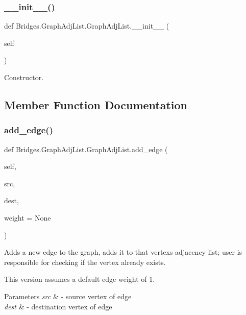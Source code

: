\subsubsection{\texorpdfstring{\+\_\+\+\_\+init\+\_\+\+\_\+()}{\_\_init\_\_()}}
{\footnotesize\ttfamily def Bridges.\+Graph\+Adj\+List.\+Graph\+Adj\+List.\+\_\+\+\_\+init\+\_\+\+\_\+ (\begin{DoxyParamCaption}\item[{}]{self }\end{DoxyParamCaption})}



Constructor. 



\subsection{Member Function Documentation}
\mbox{\label{class_bridges_1_1_graph_adj_list_1_1_graph_adj_list_a34468778a7dade4ed5a826847352f52d}} 
\subsubsection{\texorpdfstring{add\+\_\+edge()}{add\_edge()}}
{\footnotesize\ttfamily def Bridges.\+Graph\+Adj\+List.\+Graph\+Adj\+List.\+add\+\_\+edge (\begin{DoxyParamCaption}\item[{}]{self,  }\item[{}]{src,  }\item[{}]{dest,  }\item[{}]{weight = {\ttfamily None} }\end{DoxyParamCaption})}



Adds a new edge to the graph, adds it to that vertex\textquotesingle{}s adjacency list; user is responsible for checking if the vertex already exists. 

This version assumes a default edge weight of 1.


\begin{DoxyParams}{Parameters}
{\em src} & -\/ source vertex of edge \\
\hline
{\em dest} & -\/ destination vertex of edge \\
\hline
\end{DoxyParams}
\mbox{\label{class_bridges_1_1_graph_adj_list_1_1_graph_adj_list_adcbfcd7291f131383fdb3fca05dd0b59}} 
